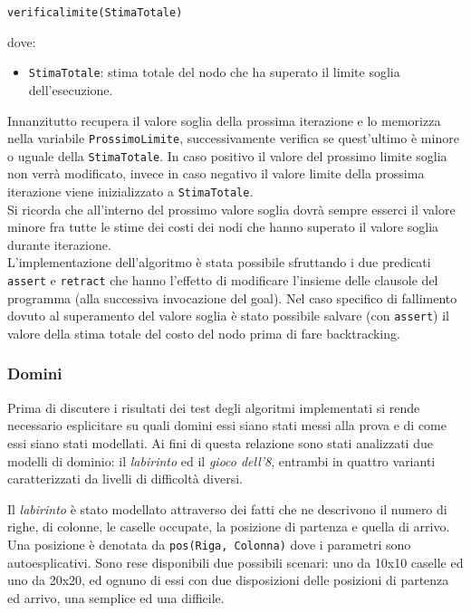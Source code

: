 \documentclass[a4paper,oneside,12pt]{book}
\def \code#1{\texttt{#1}}
\begin{document}
	\begin{center}

		\code{verifica\textunderscore limite(StimaTotale)}
	\end{center}
	dove:
	\begin{itemize}
		\item \code{StimaTotale}: stima totale del nodo che ha superato il limite soglia dell'esecuzione.
	\end{itemize}
	Innanzitutto recupera il valore soglia della prossima iterazione e lo memorizza nella variabile \code{ProssimoLimite}, successivamente verifica se quest'ultimo è minore o uguale della \code{StimaTotale}. In caso positivo il valore del prossimo limite soglia non verrà modificato, invece in caso negativo il valore limite della prossima iterazione viene inizializzato a \code{StimaTotale}. \\
	Si ricorda che all'interno del prossimo valore soglia dovrà sempre esserci il valore minore fra tutte le stime dei costi dei nodi che hanno superato il valore soglia durante iterazione. \\
	L'implementazione dell'algoritmo è stata possibile sfruttando i due predicati \code{assert} e \code{retract} che hanno l'effetto di modificare l'insieme delle clausole del programma (alla successiva invocazione del goal). Nel caso specifico di fallimento dovuto al superamento del valore soglia è stato possibile salvare (con \code{assert}) il valore della stima totale del costo del nodo prima di fare backtracking.

	\subsubsection{Domini}
	Prima di discutere i risultati dei test degli algoritmi implementati si rende necessario esplicitare su quali domini essi siano stati messi alla prova e di come essi siano stati modellati. Ai fini di questa relazione sono stati analizzati due modelli di dominio: il \textit{labirinto} ed il \textit{gioco dell’8}, entrambi in quattro varianti caratterizzati da livelli di difficoltà diversi.

	Il \textit{labirinto} è stato modellato attraverso dei fatti che ne descrivono il numero di righe, di colonne, le caselle occupate, la posizione di partenza e quella di arrivo. Una posizione è denotata da \code{pos(Riga, Colonna)} dove i parametri sono autoesplicativi. Sono rese disponibili due possibili scenari: uno da 10x10 caselle ed uno da 20x20, ed ognuno di essi con due disposizioni delle posizioni di partenza ed arrivo, una semplice ed una difficile.
\end{document}
